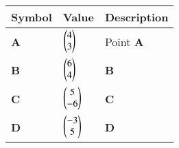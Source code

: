 \begin{tabular}{|m{5em} |m{5em}| m{10em} | }
    \hline
    \textbf{Symbol} &\textbf{Value} &\textbf{Description} \\
    \hline
         \textbf{A} & $\begin{pmatrix}4\\3\end{pmatrix}$ & Point \textbf{A} \\
    \hline
        \textbf{B} &$\begin{pmatrix}6\\4\end{pmatrix}$ &\textbf{B} \\
    \hline
        \textbf{C} & $\begin{pmatrix}5\\-6\end{pmatrix}$ & \textbf{C}\\
    \hline
        \textbf{D} & $\begin{pmatrix}-3\\5\end{pmatrix}$ & \textbf{D}\\
    \hline

    \end{tabular} 
